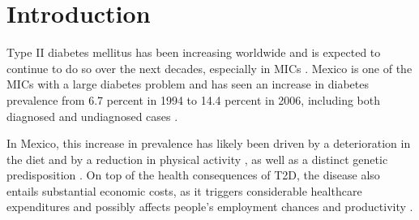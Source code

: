 \section{\label{sec:Introduction}Introduction}

Type II diabetes mellitus has been increasing worldwide and is expected to continue to do so over the next decades, especially in \ac{MICs} \citep{InternationalDiabetesFederation2013}.
Mexico is one of the  \ac{MICs} with a large diabetes problem and has seen an increase in diabetes prevalence from 6.7 percent in 1994 to 14.4 percent in 2006, including both diagnosed and undiagnosed cases \cite{Barquera2013}.

In Mexico, this increase in prevalence has likely been driven by a deterioration
in the diet and by a reduction in physical activity \citep{Barquera2008b,Basu2013},
as well as a distinct genetic predisposition \citep{Williams2013}.
On top of the health consequences of \ac{T2D}, the disease also
entails substantial economic costs, as it triggers considerable healthcare
expenditures and possibly affects people's employment chances and
productivity \cite{25787932}.

